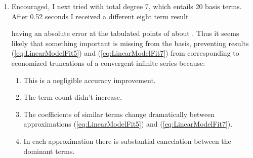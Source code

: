 \documentclass[12pt,english]{article}
\begin{document}
\begin{enumerate}
However, standard regression software is much faster for merely optimizing
some parameters in a specific form -- and more accurate if done with
arbitrary-precision arithmetic.\footnote{This is another area where other kinds of mathematical software could
help Eureqa. Eureqa would probably be much faster if it used standard
linear or nonlinear regression while it is merely \textsl{adjusting}
coefficients in a particular form. Now that Eureqa has demonstrated
how well genetic search can do unassisted, there is no reason not
to make it much faster with assistance from other disciplines.} The largest total degree in Eureqa result (\ref{eq:MorePrecise})
is 5. Consequently I next used the \textsl{Mathematica} 
function with the 12 basis expressions of the form 
having odd total degree . After 0.27 seconds I received
the following eight term result whose significant digits I have truncated
for brevity:\vspace{-5pt}

The maximum absolute error at the tabulated points was about ,
which is two more significant digits than (\ref{eq:MorePrecise})
for the same total degree and only one more term. Very gratifying.\vspace{-5pt}

\item Encouraged, I next tried  with
total degree 7, which entails 20 basis terms. After 0.52 seconds I
received a different eight term result\vspace{-5pt}

having an absolute error at the tabulated points of about .
Thus it seems likely that something important is missing from the
basis, preventing results (\ref{eq:LinearModelFit5}) and (\ref{eq:LinearModelFit7})
from corresponding to economized truncations of a convergent infinite
series because:\vspace{-5pt}


\begin{enumerate}
\item This is a negligible accuracy improvement.\vspace{-3pt}

\item The term count didn't increase.\vspace{-3pt}

\item The coefficients of similar terms change dramatically between approximations
(\ref{eq:LinearModelFit5}) and (\ref{eq:LinearModelFit7}).\vspace{-3pt}

\item In each approximation there is substantial cancelation between the
dominant terms.\vspace{-5pt}

\end{enumerate}
\end{enumerate}
\end{document}
